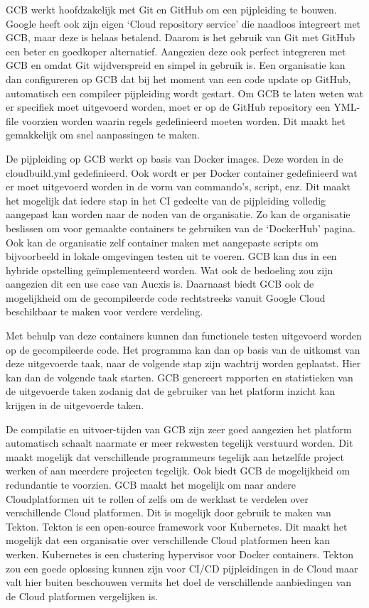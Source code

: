 GCB werkt hoofdzakelijk met Git en GitHub om een pijpleiding te bouwen. Google heeft ook zijn eigen ‘Cloud repository service’ die naadloos integreert met GCB, maar deze is helaas betalend. Daarom is het gebruik van Git met GitHub een beter en goedkoper alternatief. Aangezien deze ook perfect integreren met GCB en omdat Git wijdverspreid en simpel in gebruik is. Een organisatie kan dan configureren op GCB dat bij het moment van een code update op GitHub, automatisch een compileer pijpleiding wordt gestart. Om GCB te laten weten wat er specifiek moet uitgevoerd worden, moet er op de GitHub repository een YML-file voorzien worden waarin regels gedefinieerd moeten worden. Dit maakt het gemakkelijk om snel aanpassingen te maken.

De pijpleiding op GCB werkt op basis van Docker images. Deze worden in de cloudbuild.yml gedefinieerd. Ook wordt er per Docker container gedefinieerd wat er moet uitgevoerd worden in de vorm van commando’s, script, enz. Dit maakt het mogelijk dat iedere stap in het CI gedeelte van de pijpleiding volledig aangepast kan worden naar de noden van de organisatie. Zo kan de organisatie beslissen om voor gemaakte containers te gebruiken van de ‘DockerHub’ pagina. Ook kan de organisatie zelf container maken met aangepaste scripts om bijvoorbeeld in lokale omgevingen testen uit te voeren. GCB kan dus in een hybride opstelling geïmplementeerd worden. Wat ook de bedoeling zou zijn aangezien dit een use case van Aucxis is. Daarnaast biedt GCB ook de mogelijkheid om de gecompileerde code rechtstreeks vanuit Google Cloud beschikbaar te maken voor verdere verdeling.

Met behulp van deze containers kunnen dan functionele testen uitgevoerd worden op de gecompileerde code. Het programma kan dan op basis van de uitkomst van deze uitgevoerde taak, naar de volgende stap zijn wachtrij worden geplaatst. Hier kan dan de volgende taak starten. GCB genereert rapporten en statistieken van de uitgevoerde taken zodanig dat de gebruiker van het platform inzicht kan krijgen in de uitgevoerde taken.

De compilatie en uitvoer-tijden van GCB zijn zeer goed aangezien het platform automatisch schaalt naarmate er meer rekwesten tegelijk verstuurd worden. Dit maakt mogelijk dat verschillende programmeurs tegelijk aan hetzelfde project werken of aan meerdere projecten tegelijk. Ook biedt GCB de mogelijkheid om redundantie te voorzien. GCB maakt het mogelijk om naar andere Cloudplatformen uit te rollen of zelfs om de werklast te verdelen over verschillende Cloud platformen. Dit is mogelijk door gebruik te maken van Tekton. Tekton is een open-source framework voor Kubernetes. Dit maakt het mogelijk dat een organisatie over verschillende Cloud platformen heen kan werken. Kubernetes is een clustering hypervisor voor Docker containers. Tekton zou een goede oplossing kunnen zijn voor CI/CD pijpleidingen in de Cloud maar valt hier buiten beschouwen vermits het doel de verschillende aanbiedingen van de Cloud platformen vergelijken is.

